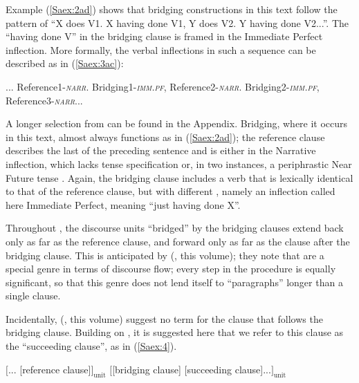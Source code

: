 \documentclass[output=paper]{LSP/langsci}
\begin{document}
Example (\ref{Saex:2ad}) shows that  bridging constructions in this text follow the pattern of ``X does V1. X having done V1, Y does V2. Y having done V2...''. The ``having done V'' in the bridging clause is framed in the Immediate Perfect inflection. More formally, the verbal inflections in such a sequence can be described as in (\ref{Saex:3ac}): 

\begin{exe}
\ex \label{Saex:3ac}
\begin{xlist}
\ex \label{Saex:3a}
\glt ... Reference1-\textit{\textsc{narr}}.
\ex \label{Saex:3b}
\glt Bridging1-\textit{\textsc{imm.pf}}, Reference2-\textit{\textsc{narr}}.
\ex \label{Saex:3c}
\glt Bridging2-\textit{\textsc{imm.pf}}, Reference3-\textit{\textsc{narr}}...
\end{xlist}
\end{exe}


A longer selection from \citet{Chesi2014} can be found in the Appendix. Bridging, where it occurs in this text, almost always functions as in (\ref{Saex:2ad}); the reference clause describes the last  of the preceding sentence and is either in the Narrative inflection, which lacks tense specification or, in two instances, a periphrastic Near Future tense \citep[see][]{Sarvasy2016}. Again, the bridging clause includes a verb that is lexically identical to that of the reference clause, but with different , namely an inflection called here Immediate Perfect, meaning ``just having done X''.

Throughout \citet{Chesi2014}, the discourse units ``bridged'' by the bridging clauses extend back only as far as the reference clause, and forward only as far as the clause after the bridging clause. This is anticipated by \citeauthor{guerin18} (, this volume); they note that  are a special genre in terms of discourse flow; every step in the procedure is equally significant, so that this genre does not lend itself to ``paragraphs'' longer than a single clause. 

Incidentally, \citeauthor{guerin18} (, this volume) suggest no term for the clause that follows the bridging clause. Building on , it is suggested here that we refer to this clause as the ``succeeding clause'', as in (\ref{Saex:4}).

\begin{exe}
	\ex	\label{Saex:4}
		\glt	$\big[$... [reference clause]$\big]_{\text{unit}}$  $\big[$[bridging clause] [succeeding clause]...$\big]_{\text{unit}}$
\end{exe}
\end{document}
